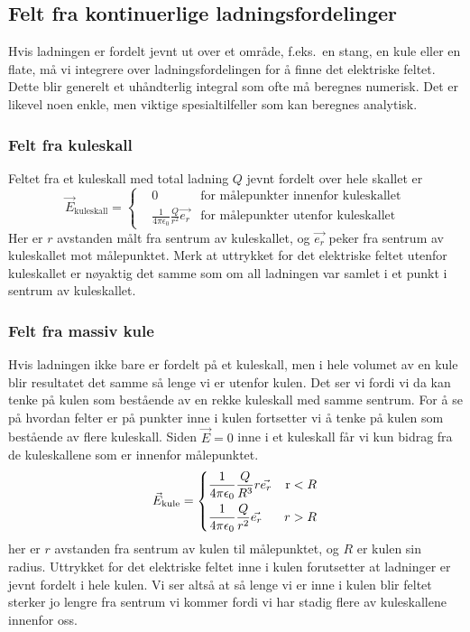 \documentclass[a4paper,norsk,12pt]{article}
\begin{document}
\subsection*{Felt fra kontinuerlige ladningsfordelinger}
Hvis ladningen er fordelt jevnt ut over et område, f.eks.~en stang, en kule eller en flate, må vi integrere over ladningsfordelingen for å finne det elektriske feltet. Dette blir generelt et  uhåndterlig integral som ofte må beregnes numerisk. Det er likevel noen enkle, men viktige spesialtilfeller som kan beregnes analytisk.

\subsubsection*{Felt fra kuleskall}
Feltet fra et kuleskall med total ladning $Q$ jevnt fordelt over hele skallet er
\begin{displaymath}
	\vec{E}_\text{kuleskall} = \left\{
	\begin{aligned}
		&0 &\text{for målepunkter innenfor kuleskallet}\\
		&\frac{1}{4\pi\epsilon_0}\frac{Q}{r^2}\vec{e_r} &\text{for målepunkter utenfor kuleskallet}
	\end{aligned}
	\right.
\end{displaymath}
Her er $r$ avstanden målt fra sentrum av kuleskallet, og $\vec{e_r}$ peker fra sentrum av kuleskallet mot målepunktet. Merk at uttrykket for det elektriske feltet utenfor kuleskallet er nøyaktig det samme som om all ladningen var samlet i et punkt i sentrum av kuleskallet.

\subsubsection*{Felt fra massiv kule}
Hvis ladningen ikke bare er fordelt på et kuleskall, men i hele volumet av en kule blir resultatet det samme så lenge vi er utenfor kulen. Det ser vi fordi vi da kan tenke på kulen som bestående av en rekke kuleskall med samme sentrum. For å se på hvordan felter er på punkter inne i kulen fortsetter vi å tenke på kulen som bestående av flere kuleskall. Siden $\vec{E}=0$ inne i et kuleskall får vi kun bidrag fra de kuleskallene som er innenfor målepunktet.
\begin{displaymath}
	\vec{E}_\text{kule} = \left\{
	\begin{aligned}
		& \frac{1}{4\pi\epsilon_0}\frac{Q}{R^3}r\vec{e_r}&\text r<R\\
		&\frac{1}{4\pi\epsilon_0}\frac{Q}{r^2}\vec{e_r} &r>R
	\end{aligned}
	\right.
\end{displaymath}
her er $r$ avstanden fra sentrum av kulen til målepunktet, og $R$ er kulen sin radius. Uttrykket for det elektriske feltet inne i kulen forutsetter at ladninger er jevnt fordelt i hele kulen. Vi ser altså at så lenge vi er inne i kulen blir feltet sterker jo lengre fra sentrum vi kommer fordi vi har stadig flere av kuleskallene innenfor oss.
\end{document}

